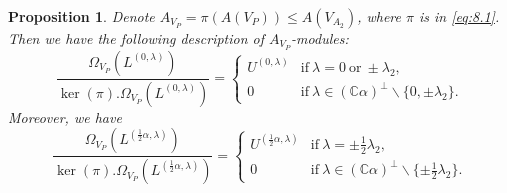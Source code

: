 \documentclass[12pt,a4paper,reqno]{amsart}
\numberwithin{equation}{section}
\numberwithin{equation}{section}
\newtheorem{prop}[thm]{Proposition}
\theoremstyle{definition}
\def \C {\mathbb{C}}
\def\la{\lambda}
\def \al{\alpha}
\def \bs {\backslash}
\def\Om{\Omega}
\begin{document}
	\begin{prop}\label{lm:inducibleV_Pmodules}
		Denote $A_{V_P}=\pi(A(V_P))\leq A(V_{A_2})$, where $\pi$ is in \eqref{eq:8.1}. Then we have the following description of $A_{V_P}$-modules:
		\begin{equation}\label{eq:inducibleVPmodules}
			\frac{\Om_{V_P}(L^{(0,\la)})}{\ker(\pi).\Om_{V_P}(L^{(0,\la)})}=\begin{cases}
				U^{(0,\la)}&\mathrm{if}\ \la=0\ \mathrm{or}\ \pm\la_2,\\
				0&\mathrm{if}\ \la\in (\C\al)^\perp\bs\{ 0,\pm\la_2\}.
			\end{cases}
		\end{equation}
		Moreover, we have 
		\begin{equation}\label{eq:inducibleVPmodules2}
			\frac{\Om_{V_P}(L^{(\frac{1}{2}\al,\la)})}{\ker(\pi).\Om_{V_P}(L^{(\frac{1}{2}\al,\la)})}=
			\begin{cases}
				U^{(\frac{1}{2}\al,\la)} &\mathrm{if}\ \la=\pm \frac{1}{2}\la_2,\\
				0&\mathrm{if}\ \la\in (\C\al)^\perp\bs\{\pm\frac{1}{2}\la_2\}.
			\end{cases}
		\end{equation}
	\end{prop}
\end{document}
